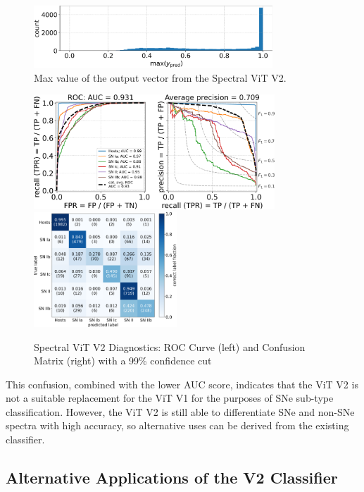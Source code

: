 \begin{figure}[t!]
    \centering
    \includegraphics[width=0.8\textwidth]{figures/v2_real/vit_model_V2max_ypred_26.png}
    \caption[Spectral ViT V2 Confidence]{Max value of the output vector from the Spectral ViT V2.\label{fig:v2_max}}
\end{figure}

\begin{figure}[b!]
    \centering
    \includegraphics[height=4.3cm]{figures/v2_real/vit_model_V2roc99_e26.png}
    \quad
    \includegraphics[height=4.3cm]{figures/v2_real/vit_model_V2cm99_e26.png}
    \caption[Spectral ViT V2 Diagnostics: 99\% Cut]{Spectral ViT V2 Diagnostics: ROC Curve (left) and Confusion Matrix (right) with a 99\% confidence
    cut\label{fig:v2_99_qual}}
\end{figure}

This confusion, combined with the lower AUC score, indicates that the ViT V2 is not a suitable replacement for the ViT V1 for the purposes of SNe sub-type classification. However, the ViT V2 is still able to differentiate SNe and non-SNe spectra with high accuracy, so alternative uses can be derived from the existing classifier. 

\subsection{Alternative Applications of the V2 Classifier}

